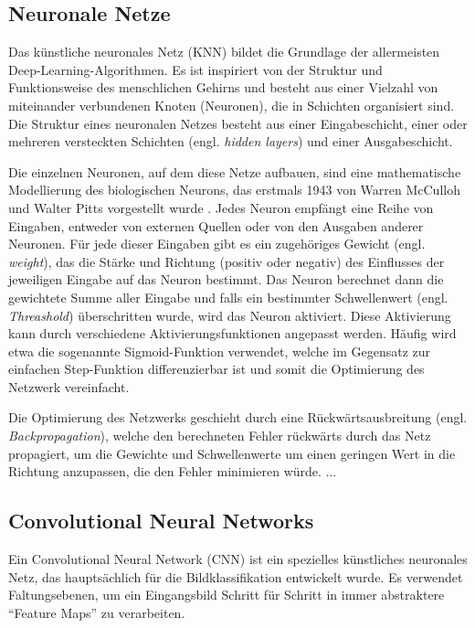 \subsection{Neuronale Netze}

Das künstliche neuronales Netz (KNN) bildet die Grundlage der allermeisten Deep-Learning-Algorithmen. Es ist inspiriert von der Struktur und Funktionsweise des menschlichen Gehirns und besteht aus einer Vielzahl von miteinander verbundenen Knoten (Neuronen), die in Schichten organisiert sind. Die Struktur eines neuronalen Netzes besteht aus einer Eingabeschicht, einer oder mehreren versteckten Schichten (engl. \textit{hidden layers}) und einer Ausgabeschicht.

Die einzelnen Neuronen, auf dem diese Netze aufbauen, sind eine mathematische Modellierung des biologischen Neurons, das erstmals 1943 von Warren McCulloh und Walter Pitts vorgestellt wurde \parencite{Zhou2021}. Jedes Neuron empfängt eine Reihe von Eingaben, entweder von externen Quellen oder von den Ausgaben anderer Neuronen. Für jede dieser Eingaben gibt es ein zugehöriges Gewicht (engl. \textit{weight}), das die Stärke und Richtung (positiv oder negativ) des Einflusses der jeweiligen Eingabe auf das Neuron bestimmt. Das Neuron berechnet dann die gewichtete Summe aller Eingabe und falls ein bestimmter Schwellenwert (engl. \textit{Threashold}) überschritten wurde, wird das Neuron aktiviert. Diese Aktivierung kann durch verschiedene Aktivierungsfunktionen angepasst werden. Häufig wird etwa die sogenannte Sigmoid-Funktion verwendet, welche im Gegensatz zur einfachen Step-Funktion differenzierbar ist und somit die Optimierung des Netzwerk vereinfacht.

Die Optimierung des Netzwerks geschieht durch eine Rückwärtsausbreitung (engl. \textit{Backpropagation}), welche den berechneten Fehler rückwärts durch das Netz propagiert, um die Gewichte und Schwellenwerte um einen geringen Wert in die Richtung anzupassen, die den Fehler minimieren würde. ...

\subsection{Convolutional Neural Networks}

Ein Convolutional Neural Network (CNN) ist ein spezielles künstliches neuronales Netz, das hauptsächlich für die Bildklassifikation entwickelt wurde. Es verwendet Faltungsebenen, um ein Eingangsbild Schritt für Schritt in immer abstraktere “Feature Maps” zu verarbeiten.

